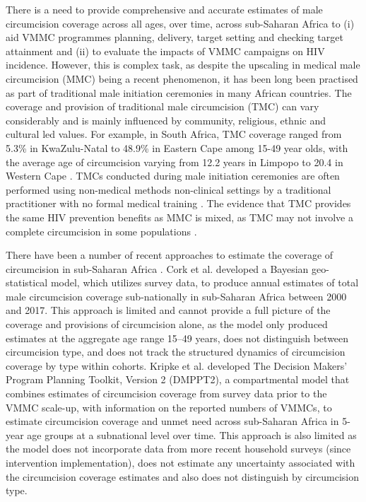 \documentclass{article}
\begin{document}
There is a need to provide comprehensive  and accurate estimates of male circumcision coverage across all ages, over time, across sub-Saharan Africa to (i) aid VMMC programmes planning, delivery, target setting and checking target attainment and (ii) to evaluate the impacts of VMMC campaigns on HIV incidence. However, this is complex task, as despite the upscaling in medical male circumcision (MMC) being a recent phenomenon, it has been long been practised as part of traditional male initiation ceremonies in many African countries. The coverage and provision of traditional male circumcision (TMC) can vary considerably and is mainly influenced by community, religious, ethnic and cultural led values. For example, in South Africa, TMC coverage ranged from 5.3\% in KwaZulu-Natal to 48.9\% in Eastern Cape among 15-49 year olds, with the average age of circumcision varying from 12.2 years in Limpopo to 20.4 in Western Cape \cite{thomas2024substantial}.  TMCs conducted during male initiation ceremonies are often performed using non-medical methods non-clinical settings by a traditional practitioner with no formal medical training \cite{drain2006male, wilcken2010traditional, weiss2000male}. The evidence that TMC provides the same HIV prevention benefits as MMC is mixed, as TMC may not involve a complete circumcision in some populations \cite{WHOTraditional, shaffer2007protective, bailey2008male}.  

There have been a number of recent approaches to estimate the coverage of circumcision in sub-Saharan Africa \cite{cork2020mapping, kripke2016age, kripke2016cost, thomas2024substantial}. Cork et al. \cite{cork2020mapping} developed a Bayesian geo-statistical model, which utilizes survey data, to produce annual estimates of total male circumcision coverage sub-nationally in sub-Saharan Africa between 2000 and 2017. This approach is limited and cannot provide a full picture of the coverage and provisions of circumcision alone, as the model only produced estimates at the aggregate age range 15–49 years, does not distinguish between circumcision type, and does not track the structured dynamics of circumcision coverage by type within cohorts. Kripke et al. \cite{kripke2016age, kripke2016cost} developed The Decision Makers’ Program Planning Toolkit, Version 2 (DMPPT2), a compartmental model that combines estimates of circumcision coverage from survey data prior to the VMMC scale-up, with information on the reported numbers of VMMCs, to estimate circumcision coverage and unmet need across sub-Saharan Africa in 5-year age groups at a subnational level over time. This approach is also limited as the model does not incorporate data from more recent household surveys (since intervention implementation), does not estimate any uncertainty associated with the circumcision coverage estimates and also does not distinguish by circumcision type. 
\end{document}
